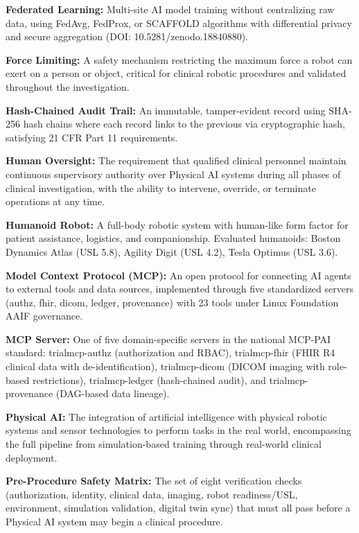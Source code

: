 \documentclass[11pt]{article}
\begin{document}
\textbf{Federated Learning:} Multi-site AI model training without centralizing raw data, using FedAvg, FedProx, or SCAFFOLD algorithms with differential privacy and secure aggregation (DOI: 10.5281/zenodo.18840880).

\textbf{Force Limiting:} A safety mechanism restricting the maximum force a robot can exert on a person or object, critical for clinical robotic procedures and validated throughout the investigation.

\textbf{Hash-Chained Audit Trail:} An immutable, tamper-evident record using SHA-256 hash chains where each record links to the previous via cryptographic hash, satisfying 21 CFR Part 11 requirements.

\textbf{Human Oversight:} The requirement that qualified clinical personnel maintain continuous supervisory authority over Physical AI systems during all phases of clinical investigation, with the ability to intervene, override, or terminate operations at any time.

\textbf{Humanoid Robot:} A full-body robotic system with human-like form factor for patient assistance, logistics, and companionship. Evaluated humanoids: Boston Dynamics Atlas (USL 5.8), Agility Digit (USL 4.2), Tesla Optimus (USL 3.6).

\textbf{Model Context Protocol (MCP):} An open protocol for connecting AI agents to external tools and data sources, implemented through five standardized servers (authz, fhir, dicom, ledger, provenance) with 23 tools under Linux Foundation AAIF governance.

\textbf{MCP Server:} One of five domain-specific servers in the national MCP-PAI standard: trialmcp-authz (authorization and RBAC), trialmcp-fhir (FHIR R4 clinical data with de-identification), trialmcp-dicom (DICOM imaging with role-based restrictions), trialmcp-ledger (hash-chained audit), and trialmcp-provenance (DAG-based data lineage).

\textbf{Physical AI:} The integration of artificial intelligence with physical robotic systems and sensor technologies to perform tasks in the real world, encompassing the full pipeline from simulation-based training through real-world clinical deployment.

\textbf{Pre-Procedure Safety Matrix:} The set of eight verification checks (authorization, identity, clinical data, imaging, robot readiness/USL, environment, simulation validation, digital twin sync) that must all pass before a Physical AI system may begin a clinical procedure.
\end{document}
